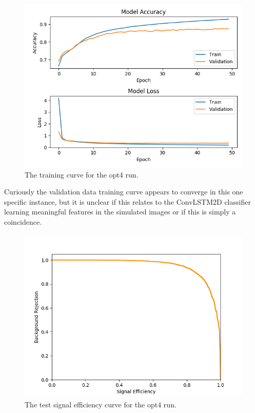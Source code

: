 \begin{figure}[] 
        \centering \includegraphics[width=\columnwidth]{figures/crabrun2opt4trainlog.png}

        \caption{
                \label{fig:opt4_trainlog} The training curve for the opt4 run.
        }
\end{figure}

Curiously the validation data training curve appears to converge in this one specific instance, but it is unclear if this relates to the ConvLSTM2D classifier learning meaningful features in the simulated images or if this is simply a coincidence. 

\begin{figure}[ht] 
        \centering \includegraphics[width=\columnwidth]{figures/crabrun2opt4_sigeff.png}

        \caption{
                \label{fig:opt4_sigeff} The test signal efficiency curve for the opt4 run.
        }
\end{figure}

